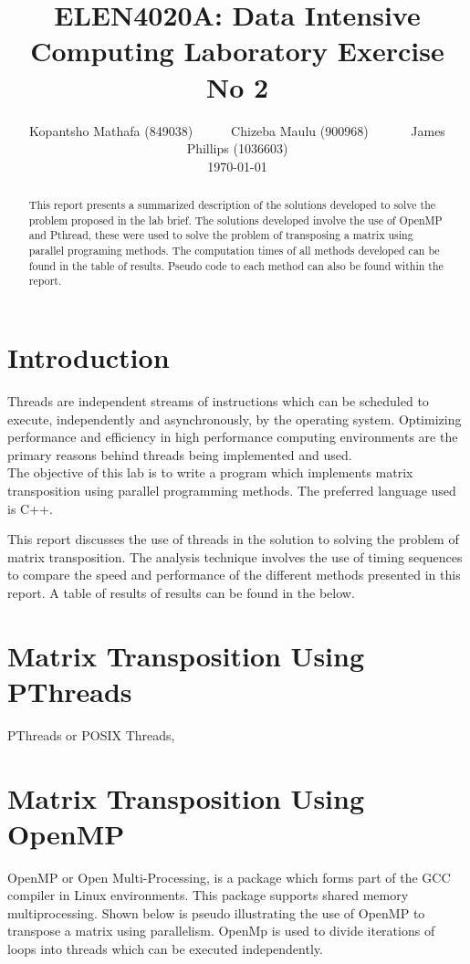 \documentclass[a4paper, 11pt, onecolumn, conference]{IEEEtran}      %
\title{\LARGE \bf
ELEN4020A: Data Intensive Computing Laboratory Exercise No 2
}
\author{ Kopantsho Mathafa (849038)\ \ \ \ \ \ Chizeba Maulu (900968) \ \ \ \ \ \ James Phillips (1036603) \\ \today \\
}
\begin{document}
\maketitle

\begin{abstract}
    This report presents a summarized description of the solutions developed to solve the problem proposed in the lab brief. The solutions developed involve the use of OpenMP and Pthread, these were used to solve the problem of transposing a matrix using parallel programing methods. The computation times of all methods developed can be found in the table of results. Pseudo code to each method can also be found within the report.
\end{abstract}

\section{Introduction}
Threads are independent streams of instructions which can be scheduled to execute, independently and asynchronously, by the operating system. Optimizing performance and efficiency in high performance computing environments are the primary reasons behind threads being implemented and used. \\

The objective of this lab is to write a program which implements matrix transposition using parallel programming methods. The preferred language used is C++.

This report discusses the use of threads in the solution to solving the problem of matrix transposition. The analysis technique involves the use of timing sequences to compare the speed and performance of the different methods presented in this report. A table of results of results can be found in the below. 

\section{Matrix Transposition Using PThreads}

PThreads or POSIX Threads, 

\section{Matrix Transposition Using OpenMP}

OpenMP or Open Multi-Processing, is a package which forms part of the GCC compiler in Linux environments. This package supports shared memory multiprocessing. Shown below is pseudo illustrating the use of OpenMP to transpose a matrix using parallelism. OpenMp is used to divide iterations of loops into threads which can be executed independently. 
\end{document}
